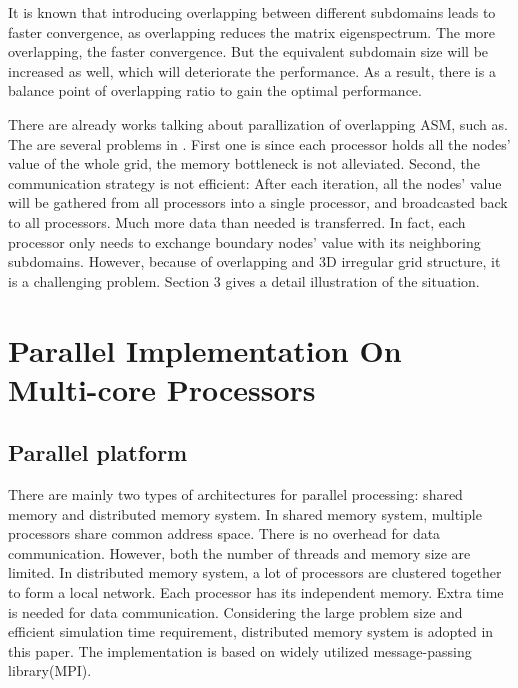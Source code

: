 \documentclass{sig-alternate}
\begin{document}
	It is known that introducing overlapping between different subdomains leads to faster convergence, 
	as overlapping reduces the matrix eigenspectrum\cite{Klawonn, Taopeng}. The more overlapping, the faster convergence.
	But the equivalent subdomain size will  be increased as well, which will deteriorate the performance. As a result, there is a 
	balance point of overlapping ratio to gain the optimal performance.
\begin{comment}
	SOR, PCG, MG methods can be combined with ASM to accelerate convergence. However, there are limitations of the resulting
	methods. SOR method is not 
	stable, as the optimal $w$ value depends on system matrix eigenvalues. It is hard to choose the optimal $w$ for large
	size problem, a bad $w$ value can even lead to divergence; MG may have
	error or even convergence problems, especially for 3D irregular grid; In PCG, a global
	matrix is required, which limits the maximum problem size that can be solved. 
\end{comment}
	There are already works talking about parallization of overlapping ASM, such as\cite{kaisun}. The are several problems in 
	\cite{kaisun}. First one is since each processor holds all the nodes' value of the whole grid, the memory bottleneck
	is not alleviated. Second, the communication strategy is not efficient: After each iteration, all the
	nodes' value will be gathered from all processors into a single processor, and broadcasted back to all processors. Much more
	data than needed is transferred. In fact, each processor only needs to exchange boundary nodes' value with its neighboring 
	subdomains. However, because of overlapping and 3D irregular grid structure, it is a challenging problem. Section 3
	gives a detail illustration of the situation.
 
\section{Parallel Implementation On \\Multi-core Processors}
  \subsection{Parallel platform}
	There are mainly two types of architectures for parallel processing: shared memory and distributed memory system. In shared 
	memory system, 
	multiple processors share common address space. There is no overhead for data communication. However, both the number
	of threads and memory size are limited. In distributed 
	memory system, a lot of processors are clustered together to form a local network. Each processor has its independent memory. 
	Extra time is needed for data communication. Considering the large problem 
	size and efficient simulation time requirement, distributed memory system is adopted in this paper. The implementation is based
	on widely utilized message-passing library(MPI).
\end{document}
